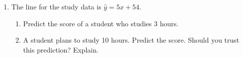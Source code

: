 \documentclass[11pt]{article}
\begin{document}
\begin{enumerate}
\begin{enumerate}[itemsep=1em]
  \work{3em}
  \item Write the equation of the line. 
  \work{1.5em}
  \item Predict the value of a 6-year-old car.

  \work{2.5em}
  \item Predict the value of a 15-year-old car. Does your answer make sense? Explain.

\end{enumerate}
\work{2.5em}

\item The line for the study data is $\hat{y} = 5x + 54$.
\begin{enumerate}[itemsep=1em]
  \item Predict the score of a student who studies 3 hours. 
  \work{1.5em}
  \item A student plans to study 10 hours. Predict the score. Should you trust this prediction? Explain.

\end{enumerate}

\end{enumerate}
\end{document}
